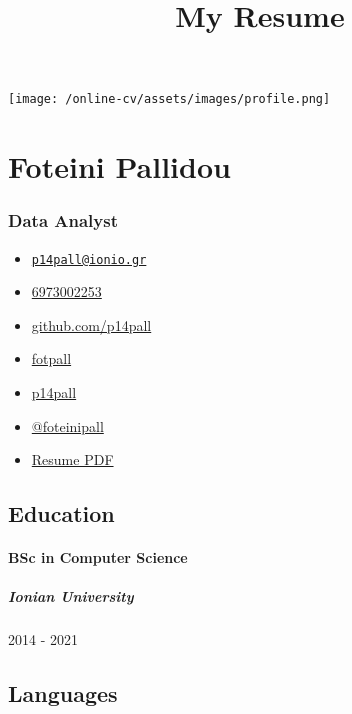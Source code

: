 \documentclass[english,]{article}
\title{My Resume}
\date{}
\providecommand{\tightlist}{%
  \setlength{\itemsep}{0pt}\setlength{\parskip}{0pt}}
\let\oldparagraph\paragraph
\renewcommand{\paragraph}[1]{\oldparagraph{#1}\mbox{}}
\let\oldsubparagraph\subparagraph
\renewcommand{\subparagraph}[1]{\oldsubparagraph{#1}\mbox{}}
\begin{document}
\maketitle

\texttt{[image: /online-cv/assets/images/profile.png]}

\hypertarget{foteini-pallidou}{%
\section{Foteini Pallidou}\label{foteini-pallidou}}

\hypertarget{data-analyst}{%
\subsubsection{Data Analyst}\label{data-analyst}}

\begin{itemize}
\tightlist
\item
  \emph{} \href{mailto:p14pall@ionio.gr}{\nolinkurl{p14pall@ionio.gr}}
\item
  \emph{} \href{tel:6973002253}{6973002253}
\item
  \emph{} \href{http://github.com/p14pall}{github.com/p14pall}
\item
  \emph{} \href{https://linkedin.com/in/fotpall}{fotpall}
\item
  \emph{} \href{http://github.com/p14pall}{p14pall}
\item
  \emph{} \href{https://twitter.com/@foteinipall}{@foteinipall}
\item
  \emph{} \href{http://www.africau.edu/images/default/sample.pdf}{Resume
  PDF}
\end{itemize}

\hypertarget{education}{%
\subsection{Education}\label{education}}

\hypertarget{bsc-in-computer-science}{%
\paragraph{BSc in Computer Science}\label{bsc-in-computer-science}}

\hypertarget{ionian-university}{%
\subparagraph{Ionian University}\label{ionian-university}}

2014 - 2021

\hypertarget{languages}{%
\subsection{Languages}\label{languages}}
\end{document}
